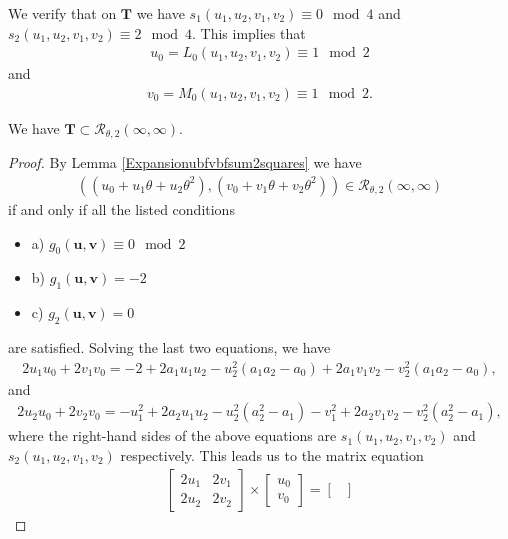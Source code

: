 \documentclass[12pt]{amsart}
\newcommand{\1}{\mathmybb{1}}
\begin{document}
We verify that on $\mathbf{T}$ we have $s_{1}(u_{1},u_{2},v_{1},v_{2}) \equiv 0 \mod 4$ and $s_{2}(u_{1},u_{2},v_{1},v_{2}) \equiv 2 \mod 4$. This implies that 
\begin{align}
\label{u0mod2lem1.6}
u_{0}= L_{0}(u_{1},u_{2},v_{1},v_{2}) \equiv 1 \mod 2
\end{align}
 and
\begin{align}
\label{v0mod2lem1.6}
v_{0} = M_{0}(u_{1},u_{2},v_{1},v_{2}) \equiv 1 \mod 2.
\end{align}
\begin{lem}
\label{TsubsetRtheta2inftyinfty}
We have $\mathbf{T} \subset \mathcal{R}_{\theta,2}(\infty,\infty)$.
\end{lem}
\begin{proof}
By Lemma \ref{Expansionubfvbfsum2squares} we have
\begin{align*}
\left((u_{0}+u_{1}\theta+u_{2}\theta^2),(v_{0}+v_{1}\theta+v_{2}\theta^2)\right) \in \mathcal{R}_{\theta,2}(\infty,\infty)
\end{align*}
if and only if all the listed conditions
\begin{itemize}
\item a) $g_{0}(\mathbf{u},\mathbf{v}) \equiv 0 \mod 2$
\item b) $g_{1}(\mathbf{u},\mathbf{v}) = -2$
\item c) $g_{2}(\mathbf{u},\mathbf{v}) = 0$
\end{itemize}
are satisfied. Solving the last two equations, we have
\begin{align*}
2u_{1}u_{0}+2v_{1}v_{0} = -2+2a_{1}u_{1}u_{2}-u_{2}^2(a_{1}a_{2}-a_{0})+2a_{1}v_{1}v_{2}-v_{2}^2(a_{1}a_{2}-a_{0}),
\end{align*}
and
\begin{align*}
2u_{2}u_{0}+2v_{2}v_{0} = -u_{1}^2+2a_{2}u_{1}u_{2}-u_{2}^2(a_{2}^2-a_{1}) -v_{1}^2+2a_{2}v_{1}v_{2}-v_{2}^2(a_{2}^2-a_{1}),
\end{align*}
where the right-hand sides of the above equations are $s_{1}(u_{1},u_{2},v_{1},v_{2})$ and $s_{2}(u_{1},u_{2},v_{1},v_{2})$ respectively. This leads us to the matrix equation
\begin{align*}
\begin{bmatrix}
2u_{1} & 2v_{1}\\
2u_{2} & 2v_{2}
\end{bmatrix}
\times
\begin{bmatrix}
u_{0} \\
v_{0}
\end{bmatrix}
=
\begin{bmatrix}

\end{bmatrix}
\end{align*}
\end{proof}
\end{document}
